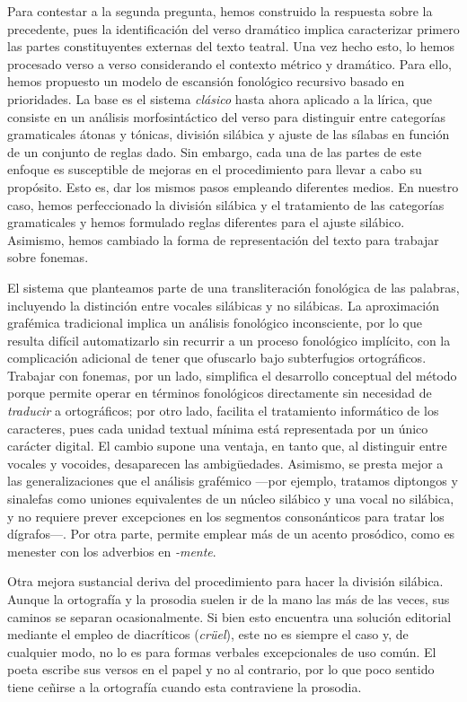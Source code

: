 Para contestar a la segunda pregunta, hemos construido la respuesta sobre la precedente, pues la identificación del verso dramático implica caracterizar primero las partes constituyentes externas del texto teatral. Una vez hecho esto, lo hemos procesado verso a verso considerando el contexto métrico y dramático. Para ello, hemos propuesto un modelo de escansión fonológico recursivo basado en prioridades. La base es el sistema \textit{clásico} hasta ahora aplicado a la lírica, que consiste en un análisis morfosintáctico del verso para distinguir entre categorías gramaticales átonas y tónicas, división silábica y ajuste de las sílabas en función de un conjunto de reglas dado. Sin embargo, cada una de las partes de este enfoque es susceptible de mejoras en el procedimiento para llevar a cabo su propósito. Esto es, dar los mismos pasos empleando diferentes medios. En nuestro caso, hemos perfeccionado la división silábica y el tratamiento de las categorías gramaticales y hemos formulado reglas diferentes para el ajuste silábico. Asimismo, hemos cambiado la forma de representación del texto para trabajar sobre fonemas.

El sistema que planteamos parte de una transliteración fonológica de las palabras, incluyendo la distinción entre vocales silábicas y no silábicas. La aproximación grafémica tradicional implica un análisis fonológico inconsciente, por lo que resulta difícil automatizarlo sin recurrir a un proceso fonológico implícito, con la complicación adicional de tener que ofuscarlo bajo subterfugios ortográficos. Trabajar con fonemas, por un lado, simplifica el desarrollo conceptual del método porque permite operar en términos fonológicos directamente sin necesidad de \textit{traducir} a ortográficos; por otro lado, facilita el tratamiento informático de los caracteres, pues cada unidad textual mínima está representada por un único carácter digital. El cambio supone una ventaja, en tanto que, al distinguir entre vocales y vocoides, desaparecen las ambigüedades. Asimismo, se presta mejor a las generalizaciones que el análisis grafémico —por ejemplo, tratamos diptongos y sinalefas como uniones equivalentes de un núcleo silábico y una vocal no silábica, y no requiere prever excepciones en los segmentos consonánticos para tratar los dígrafos—. Por otra parte, permite emplear más de un acento prosódico, como es menester con los adverbios en \textit{-mente}.

Otra mejora sustancial deriva del procedimiento para hacer la división silábica. Aunque la ortografía y la prosodia suelen ir de la mano las más de las veces, sus caminos se separan ocasionalmente. Si bien esto encuentra una solución editorial mediante el empleo de diacríticos (\textit{crüel}), este no es siempre el caso y, de cualquier modo, no lo es para formas verbales excepcionales de uso común. El poeta escribe sus versos en el papel y no al contrario, por lo  que poco sentido tiene ceñirse a la ortografía cuando esta contraviene la prosodia.

